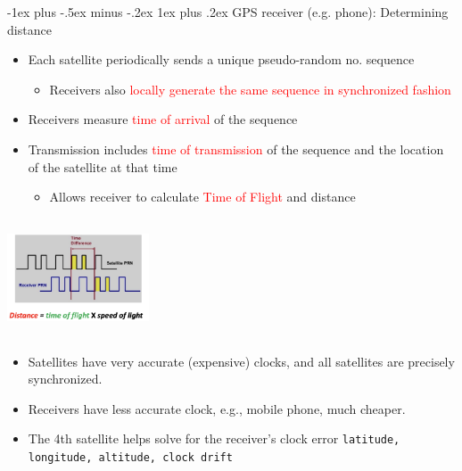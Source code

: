 \documentclass[10pt,landscape]{article}
\makeatletter
\newcommand{\subsubsubsection}{\@startsection{subsubsection}{3}{0mm}%
                                {-1ex plus -.5ex minus -.2ex}%
                                {1ex plus .2ex}%
                                {\normalfont\scriptsize\bfseries}}
\newcommand{\1}{\mathmybb{1}}
\makeatother
\begin{document}
\begin{multicols*}{3}
\subsubsubsection{GPS receiver (e.g. phone): Determining distance}
\begin{multicols}{2}
  \begin{itemize}
    \item Each satellite periodically sends a unique pseudo-random no. sequence
    \begin{itemize}
      \item Receivers also \textcolor{red}{locally generate the same sequence in synchronized fashion}
    \end{itemize}
    \item Receivers measure \textcolor{red}{time of arrival} of the sequence
    \item Transmission includes \textcolor{red}{time of transmission} of the sequence and the location of the satellite at that time
    \begin{itemize}
      \item Allows receiver to calculate \textcolor{red}{Time of Flight} and distance
    \end{itemize}
  \end{itemize}
  \columnbreak
  \includegraphics*[width=4.2cm, height=3.5cm]{images/determiningdistance.png}
\end{multicols}
\begin{itemize}
  \item Satellites have very accurate (expensive) clocks, and all satellites are precisely synchronized.
  \item Receivers have less accurate clock, e.g., mobile phone, much cheaper.
  \item The 4th satellite helps solve for the receiver’s clock error \texttt{latitude, longitude, altitude, clock drift}
\end{itemize}


\end{multicols*}
\end{document}

